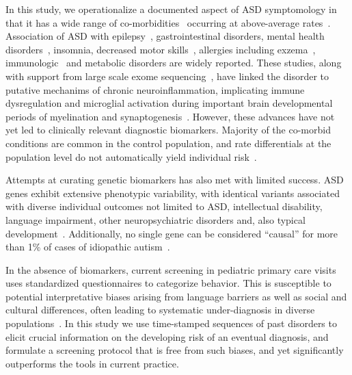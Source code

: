 \documentclass[onecolumn,,10pt]{IEEEtran}
\begin{document}
In this study, we operationalize a documented aspect of ASD symptomology in  that it has   a wide range  of co-morbidities~\cite{pmid22511918,pmid30733689,pmid25681541} occurring at above-average  rates~\cite{hyman2020identification}.
%
Association of ASD  with epilepsy~\cite{pmid23935565}, gastrointestinal disorders\cite{pmid30646068,pmid21651783,pmid30823414,pmid21282636,pmid29028817,pmid30109601}, mental health disorders~\cite{pmid24729779}, insomnia, decreased motor skills~\cite{pmid30337860}, allergies including exzema~\cite{pmid30646068,pmid21651783,pmid30823414,pmid21282636,pmid29028817,pmid30109601}, immunologic~\cite{pmid30971960,pmid30941018,pmid29691724,pmid29307081,pmid27351598,pmid26793298,pmid30095240,pmid25681541} and metabolic\cite{pmid30178105,pmid27957319,pmid29028817} disorders are  widely reported. These studies, along with support from large scale exome sequencing~\cite{Satterstrom484113,pmid25038753}, have linked the disorder to putative mechanims of  chronic neuroinflammation,  implicating immune dysregulation and microglial activation during important brain developmental periods  of  myelination and synaptogenesis~\cite{pmid15546155,pmid21595886,pmid21629840,pmid26793298,pmid30483058,pmid29691724}. However, these advances have not yet led  to %
clinically relevant diagnostic biomarkers.  Majority of the co-morbid conditions are common in the control population, and  rate differentials at the population level do not automatically yield individual risk~\cite{Pearce2000}.

Attempts at curating genetic biomarkers has also met with limited success. ASD genes exhibit extensive phenotypic variability, with identical variants associated with diverse individual outcomes not limited to ASD, intellectual disability, language impairment, other neuropsychiatric disorders and, also typical development~\cite{pmid23537858}.
Additionally, no single
gene can be considered ``causal'' for more than 1\% of cases
of idiopathic autism~\cite{pmid23637569}.

In the absence of biomarkers,  current screening  in pediatric primary care visits  uses standardized  questionnaires to categorize behavior. This is  susceptible to potential interpretative biases arising from language barriers as well as social and cultural differences, often leading to systematic under-diagnosis in diverse populations~\cite{hyman2020identification}. In this study we use  time-stamped sequences of past  disorders  to elicit crucial information on the developing risk of an eventual  diagnosis, and formulate a screening protocol that is free from such biases, and yet significantly outperforms the tools in current practice.
\end{document}
